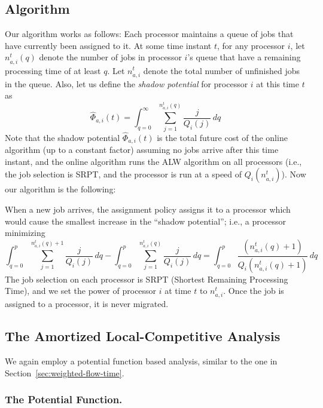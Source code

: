 \documentclass[11pt]{article}
\newcommand{\tsty}{}
\newcommand{\alw}{{\sf ALW}\xspace}
\begin{document}
\subsection{Algorithm}
\label{dsec:algorithm-uf}

Our algorithm works as follows: Each processor maintains a queue of jobs
that have currently been assigned to it.  At some time instant $t$, for
any processor $i$, let $n_{a,i}^{t}(q)$ denote the number of jobs in processor
$i$'s queue that have a remaining processing time of at least $q$. Let
$n_{a,i}^{t}$ denote the total number of unfinished jobs in the queue. Also,
let us define the \emph{shadow potential} for processor $i$ at this time
$t$ as
\begin{equation}
  \label{deq:shadow} \tsty {\widehat\Phi}_{a,i}(t) = \int_{q = 0}^{\infty} \sum_{j =
    1}^{n^{t}_{a,i}(q)} \frac{j}{Q_i(j)} \,dq
\end{equation}
Note that the shadow potential
${\widehat\Phi}_{a,i}(t)$ is the total future cost of the online
algorithm (up to a constant factor) assuming no jobs arrive after this
time instant, and the online algorithm runs the \alw algorithm on all
processors (i.e., the job selection is SRPT, and the processor is run at
a speed of $Q_i(n_{a,i}^{t})$). Now our algorithm is the following:
\begin{shadebox}
  \noindent When a new job arrives, the assignment policy assigns it to a
  processor which would cause the smallest increase in the ``shadow
  potential''; i.e., a processor minimizing
  \[
  \int_{q=0}^{p} \sum_{j=1}^{n^{t}_{a,i}(q) + 1 } \frac{j}{Q_i(j)} \,dq -
  \int_{q=0}^{p} \sum_{j=1}^{n^{t}_{a,i}(q) } \frac{j}{Q_i(j)} \,dq =
  \int_{q=0}^{p} \frac{(n^{t}_{a,i}(q) + 1)}{Q_i(n^{t}_{a,i}(q) + 1)} \,dq
  \]
  The job selection on each processor is SRPT (Shortest Remaining
  Processing Time), and we set the power of processor $i$ at time $t$ to $n_{a,i}^{t}$.  Once the job is
  assigned to a processor, it is never migrated.
\end{shadebox}



\subsection{The Amortized Local-Competitive Analysis}
\label{dsec:analysis-uf}

We again employ a potential function based analysis, similar to the one in Section~\ref{sec:weighted-flow-time}.


\subsubsection{The Potential Function.}
\end{document}
